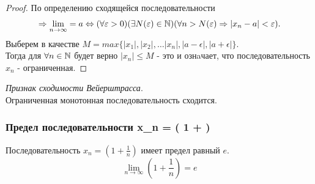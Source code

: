 \begin{proof}
  По определению сходящейся последовательности 
  \begin{gather*}
    \implies \lim_{n \to \infty} = a \iff (\forall \epsilon > 0)(\exists N(\epsilon)\in \N)(\forall n > N(\epsilon) \implies |x_{n} - a| < \epsilon).
  \end{gather*}
  Выберем в качестве $M = max \{|x_{1}|, |x_2|, \ldots |x_n|, |a - \epsilon|, |a + \epsilon|\}$. \\
Тогда для $\forall n \in \mathbb{N}$ будет верно $|x_{n}| \le M$ - это и ознaчает, что последовательность $x_{n}$ - ограниченная.
\end{proof}

\begin{theorem}
  \textit{Признак сходимости Вейерштрасса}. \\
  Ограниченная монотонная последовательность сходится.
\end{theorem}

\subsubsection{Предел последовательности x_{n} = \left( 1 +  \right)}

\begin{theorem}
  Последовательность $x_{n} = \left( 1 + \frac{1}{n} \right) $ имеет предел равный $e$.
  \[
  \lim_{n \to \infty} \left( 1 + \frac{1}{n} \right) = e 
  \] 
\end{theorem}


